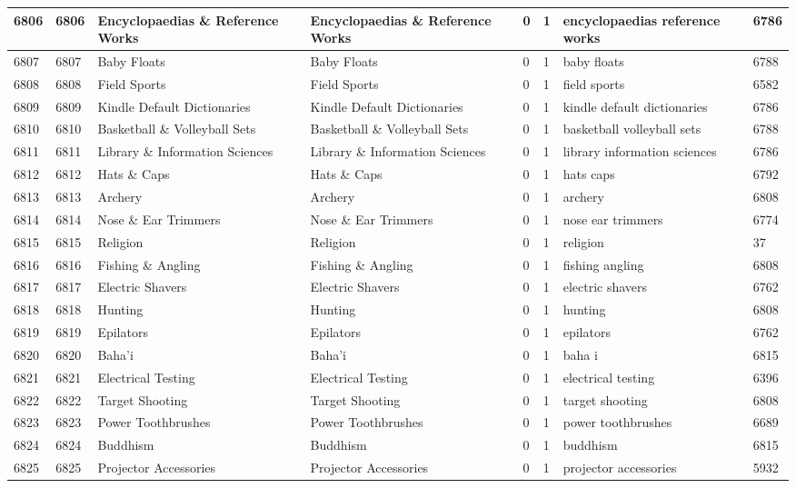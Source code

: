 \begin{longtable}{|l|l|l|l|l|l|l|l|}
6806 & 6806 & Encyclopaedias \& Reference Works & Encyclopaedias \& Reference Works & 0 & 1 & encyclopaedias reference works & 6786 \\ \hline 
6807 & 6807 & Baby Floats & Baby Floats & 0 & 1 & baby floats & 6788 \\ \hline 
6808 & 6808 & Field Sports & Field Sports & 0 & 1 & field sports & 6582 \\ \hline 
6809 & 6809 & Kindle Default Dictionaries & Kindle Default Dictionaries & 0 & 1 & kindle default dictionaries & 6786 \\ \hline 
6810 & 6810 & Basketball \& Volleyball Sets & Basketball \& Volleyball Sets & 0 & 1 & basketball volleyball sets & 6788 \\ \hline 
6811 & 6811 & Library \& Information Sciences & Library \& Information Sciences & 0 & 1 & library information sciences & 6786 \\ \hline 
6812 & 6812 & Hats \& Caps & Hats \& Caps & 0 & 1 & hats caps & 6792 \\ \hline 
6813 & 6813 & Archery & Archery & 0 & 1 & archery & 6808 \\ \hline 
6814 & 6814 & Nose \& Ear Trimmers & Nose \& Ear Trimmers & 0 & 1 & nose ear trimmers & 6774 \\ \hline 
6815 & 6815 & Religion & Religion & 0 & 1 & religion & 37 \\ \hline 
6816 & 6816 & Fishing \& Angling & Fishing \& Angling & 0 & 1 & fishing angling & 6808 \\ \hline 
6817 & 6817 & Electric Shavers & Electric Shavers & 0 & 1 & electric shavers & 6762 \\ \hline 
6818 & 6818 & Hunting & Hunting & 0 & 1 & hunting & 6808 \\ \hline 
6819 & 6819 & Epilators & Epilators & 0 & 1 & epilators & 6762 \\ \hline 
6820 & 6820 & Baha'i & Baha'i & 0 & 1 & baha i & 6815 \\ \hline 
6821 & 6821 & Electrical Testing & Electrical Testing & 0 & 1 & electrical testing & 6396 \\ \hline 
6822 & 6822 & Target Shooting & Target Shooting & 0 & 1 & target shooting & 6808 \\ \hline 
6823 & 6823 & Power Toothbrushes & Power Toothbrushes & 0 & 1 & power toothbrushes & 6689 \\ \hline 
6824 & 6824 & Buddhism & Buddhism & 0 & 1 & buddhism & 6815 \\ \hline 
6825 & 6825 & Projector Accessories & Projector Accessories & 0 & 1 & projector accessories & 5932 \\ \hline 

\end{longtable}
